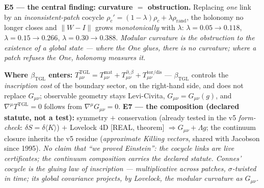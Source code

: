 \documentclass[11pt]{article}
\newcommand{\bTGL}{\beta_{\mathrm{TGL}}}\newcommand{\Msun}{M_{\odot}}\newcommand{\TGL}{\mathrm{TGL}}
\theoremstyle{definition}\newtheorem{deriv}{Derivation}
\begin{document}
\textbf{E5 --- the central finding: curvature $=$ obstruction.} Replacing \emph{one} link by an \emph{inconsistent-patch} cocycle $\rho_c'=(1-\lambda)\rho_c+\lambda\rho_{\mathrm{rand}}$, the holonomy no longer closes and $\lVert W-I\rVert$ grows \emph{monotonically} with $\lambda$: $\lambda{=}0.05\to0.118$, $\lambda{=}0.15\to0.266$, $\lambda{=}0.30\to0.388$. \emph{Modular curvature is the obstruction to the existence of a global state --- where the One glues, there is no curvature; where a patch refuses the One, holonomy measures it.}

\textbf{Where $\bTGL$ enters:} $T^{\mathrm{TGL}}_{\mu\nu}=T^{\mathrm{mat}}_{\mu\nu}+T^{\partial,\beta}_{\mu\nu}+T^{\mathrm{tor/dis}}_{\mu\nu}$ --- $\bTGL$ controls the \emph{inscription cost} of the boundary sector, on the right-hand side, and does not replace $G_{\mu\nu}$; observable geometry stays Levi-Civita, $G_{\mu\nu}=G_{\mu\nu}(g)$, and $\nabla^\mu T^{\mathrm{TGL}}=0$ follows from $\nabla^\mu G_{\mu\nu}=0$. \textbf{E7 --- the composition (declared statute, not a test):} symmetry $+$ conservation (already tested in the v5 \emph{form-check}: $\delta S=\delta\langle K\rangle$) $+$ Lovelock 4D \textsf{[REAL, theorem]} $\Rightarrow G_{\mu\nu}+\Lambda g$; the continuum closure inherits the v5 residue (\emph{approximate Killing vectors}, shared with Jacobson since 1995). \emph{No claim that ``we proved Einstein'': the cocycle links are live certificates; the continuum composition carries the declared statute. Connes' cocycle is the gluing law of inscription --- multiplicative across patches, $\sigma$-twisted in time; its global covariance projects, by Lovelock, the modular curvature as $G_{\mu\nu}$.}
\end{document}
